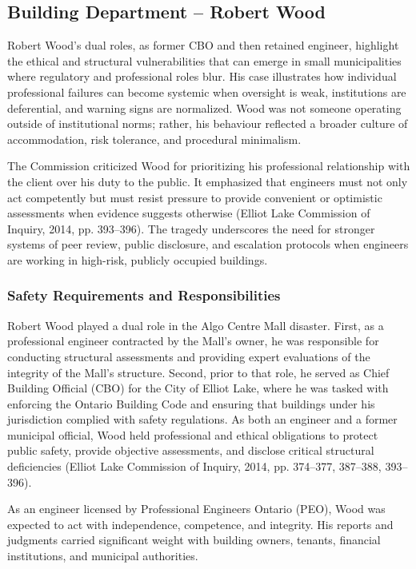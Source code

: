 \documentclass[12pt]{article}
\begin{document}
\subsection{Building Department – Robert Wood}
Robert Wood’s dual roles, as former CBO and then retained engineer, highlight the ethical and structural vulnerabilities that can emerge in small municipalities where regulatory and professional roles blur. His case illustrates how individual professional failures can become systemic when oversight is weak, institutions are deferential, and warning signs are normalized. Wood was not someone operating outside of institutional norms; rather, his behaviour reflected a broader culture of accommodation, risk tolerance, and procedural minimalism.

The Commission criticized Wood for prioritizing his professional relationship with the client over his duty to the public. It emphasized that engineers must not only act competently but must resist pressure to provide convenient or optimistic assessments when evidence suggests otherwise (Elliot Lake Commission of Inquiry, 2014, pp. 393–396). The tragedy underscores the need for stronger systems of peer review, public disclosure, and escalation protocols when engineers are working in high-risk, publicly occupied buildings.

\subsubsection*{Safety Requirements and Responsibilities}
Robert Wood played a dual role in the Algo Centre Mall disaster. First, as a professional engineer contracted by the Mall’s owner, he was responsible for conducting structural assessments and providing expert evaluations of the integrity of the Mall’s structure. Second, prior to that role, he served as Chief Building Official (CBO) for the City of Elliot Lake, where he was tasked with enforcing the Ontario Building Code and ensuring that buildings under his jurisdiction complied with safety regulations. As both an engineer and a former municipal official, Wood held professional and ethical obligations to protect public safety, provide objective assessments, and disclose critical structural deficiencies (Elliot Lake Commission of Inquiry, 2014, pp. 374–377, 387–388, 393–396).

As an engineer licensed by Professional Engineers Ontario (PEO), Wood was expected to act with independence, competence, and integrity. His reports and judgments carried significant weight with building owners, tenants, financial institutions, and municipal authorities.
\end{document}
